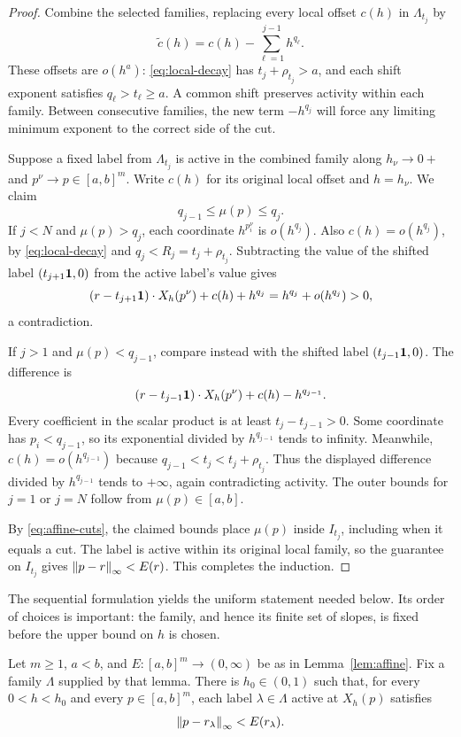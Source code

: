 \begin{proof}
Combine the selected families, replacing every local offset $c(h)$ in
$\Lambda_{t_j}$ by
\begin{equation}
 \widetilde c(h)=c(h)-\sum_{\ell=1}^{j-1}h^{q_\ell}.
 \label{eq:affine-shifts}
\end{equation}
These offsets are $o(h^a)$: \eqref{eq:local-decay} has
$t_j+\rho_{t_j}>a$, and each shift exponent satisfies
$q_\ell>t_\ell\geq a$. A common shift preserves activity within each
family. Between consecutive families, the new term $-h^{q_j}$ will
force any limiting minimum exponent to the correct side of the cut.



Suppose a fixed label from $\Lambda_{t_j}$ is active in the combined
family along $h_\nu\to0+$ and $p^\nu\to p\in[a,b]^m$. Write
$c(h)$ for its original local offset and $h=h_\nu$. We claim
\[
 q_{j-1}\leq\mu(p)\leq q_j.
\]
If $j<N$ and $\mu(p)>q_j$, each coordinate $h^{p_i^\nu}$ is
$o(h^{q_j})$. Also $c(h)=o(h^{q_j})$, by
\eqref{eq:local-decay} and $q_j<R_j=t_j+\rho_{t_j}$. Subtracting
the value of the shifted label $(t_{j+1}\mathbf 1,0)$ from the active
label's value gives
\[
 (r-t_{j+1}\mathbf 1)\cdot X_h(p^\nu)+c(h)+h^{q_j}
   =h^{q_j}+o(h^{q_j})>0,
\]
a contradiction.

If $j>1$ and $\mu(p)<q_{j-1}$, compare instead with the shifted
label $(t_{j-1}\mathbf 1,0)$. The difference is
\[
 (r-t_{j-1}\mathbf 1)\cdot X_h(p^\nu)+c(h)-h^{q_{j-1}}.
\]
Every coefficient in the scalar product is at least
$t_j-t_{j-1}>0$. Some coordinate has $p_i<q_{j-1}$, so its
exponential divided by $h^{q_{j-1}}$ tends to infinity. Meanwhile,
$c(h)=o(h^{q_{j-1}})$ because $q_{j-1}<t_j<t_j+\rho_{t_j}$.
Thus the displayed difference divided by $h^{q_{j-1}}$ tends to
$+\infty$, again contradicting activity. The outer bounds for $j=1$
or $j=N$ follow from $\mu(p)\in[a,b]$.

By \eqref{eq:affine-cuts}, the claimed bounds place $\mu(p)$ inside
$I_{t_j}$, including when it equals a cut. The label is active within
its original local family, so the guarantee on $I_{t_j}$ gives
$\left\|p-r\right\|_\infty<E(r)$. This completes the induction.
\end{proof}

The sequential formulation yields the uniform statement needed below.
Its order of choices is important: the family, and hence its finite set
of slopes, is fixed before the upper bound on $h$ is chosen.

\begin{corollary}
\label{cor:activity}
Let $m\geq1$, $a<b$, and $E:[a,b]^m\to(0,\infty)$ be as in
Lemma~\ref{lem:affine}. Fix a family $\Lambda$ supplied by that
lemma. There is $h_0\in(0,1)$ such that, for every $0<h<h_0$ and
every $p\in[a,b]^m$, each label $\lambda\in\Lambda$ active at
$X_h(p)$ satisfies
\[
 \left\|p-r_\lambda\right\|_\infty<E(r_\lambda).
\]
\end{corollary}

